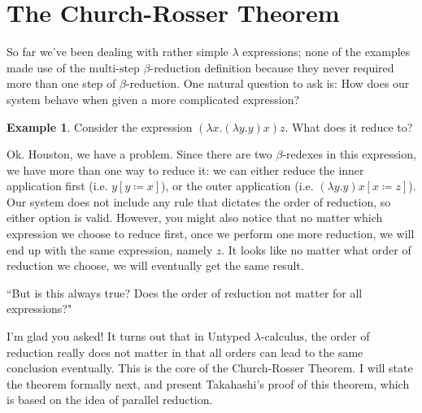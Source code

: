 \documentclass[a4paper,11pt]{article}
\theoremstyle{definition}
\theoremstyle{example}
\newtheorem*{example}{Example}
\theoremstyle{lemma}
\newtheorem{lemma}{Lemma}
\newcommand{\lcalc}{\lambda\text{-calculus}}
\newcommand{\lamterm}[2]{\lambda #1. #2}
\newcommand{\subs}[3]{#1[#2\coloneqq#3]}
\newcommand{\ssbr}{\rightarrow_{\beta}}
\newcommand{\msbr}{\twoheadrightarrow_{\beta}}
\newcommand{\tmsbr}{\text{multi-step $\beta$-reduction}}
\begin{document}



\section{The Church-Rosser Theorem}

So far we've been dealing with rather simple $\lambda$ expressions; none of the examples made use of the $\tmsbr$ definition because they never required more than one step of $\beta$-reduction. One natural question to ask is: How does our system behave when given a more complicated expression? 

\begin{example}
Consider the expression $(\lamterm{x}{(\lamterm{y}{y})x})z$. What does it reduce to?
\end{example}

Ok. Houston, we have a problem. Since there are two $\beta$-redexes in this expression, we have more than one way to reduce it: we can either reduce the inner application first (i.e. $\subs{y}{y}{x}$), or the outer application (i.e. $\subs{(\lamterm{y}{y})x}{x}{z}$). Our system does not include any rule that dictates the order of reduction, so either option is valid. However, you might also notice that no matter which expression we choose to reduce first, once we perform one more reduction, we will end up with the same expression, namely $z$. It looks like no matter what order of reduction we choose, we will eventually get the same result. 

``But is this always true? Does the order of reduction not matter for all expressions?" 

I'm glad you asked! It turns out that in Untyped $\lcalc$, the order of reduction really does not matter in that all orders can lead to the same conclusion eventually. This is the core of the Church-Rosser Theorem. I will state the theorem formally next, and present Takahashi's proof\cite{TAKAHASHI1989113} of this theorem, which is based on the idea of parallel reduction.
\end{document}
